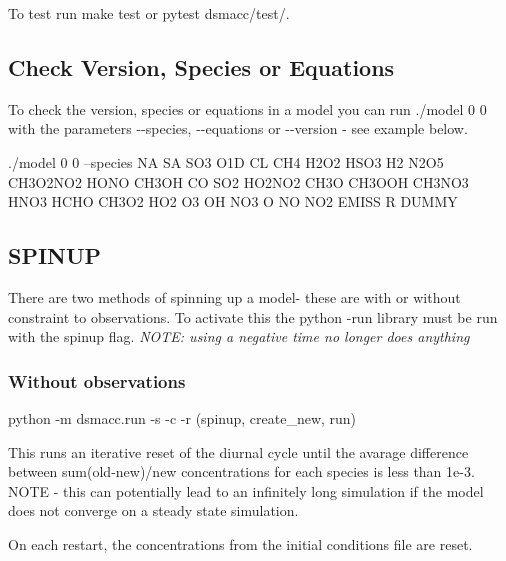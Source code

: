 To test run {\ttfamily make test} or {\ttfamily pytest dsmacc/test/}.

\subsection*{Check Version, Species or Equations}

To check the version, species or equations in a model you can run {\ttfamily ./model 0 0} with the parameters {\ttfamily -\/-\/species}, {\ttfamily -\/-\/equations} or {\ttfamily -\/-\/version} -\/ see example below.


\begin{DoxyCode}
./model 0 0 --species
 NA             SA             SO3            O1D            CL             
 CH4            H2O2           HSO3           H2             N2O5           
 CH3O2NO2       HONO           CH3OH          CO             SO2            
 HO2NO2         CH3O           CH3OOH         CH3NO3         HNO3           
 HCHO           CH3O2          HO2            O3             OH             
 NO3            O              NO             NO2            EMISS          
 R              DUMMY     
\end{DoxyCode}


\subsection*{S\+P\+I\+N\+UP}

There are two methods of spinning up a model-\/ these are with or without constraint to observations. To activate this the python -\/run library must be run with the spinup flag. {\itshape N\+O\+TE\+: using a negative time no longer does anything}

\subsubsection*{Without observations}

{\ttfamily python -\/m dsmacc.\+run -\/s -\/c -\/r} (spinup, create\+\_\+new, run)

This runs an iterative reset of the diurnal cycle until the avarage difference between {\ttfamily sum(old-\/new)/new} concentrations for each species is less than 1e-\/3. N\+O\+TE -\/ this can potentially lead to an infinitely long simulation if the model does not converge on a steady state simulation.

On each restart, the concentrations from the initial conditions file are reset.

